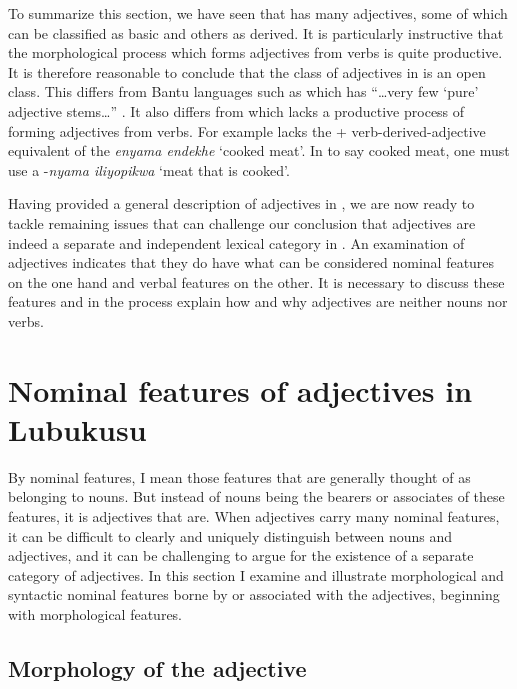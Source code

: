 \documentclass[output=paper,
modfonts
]{langscibook}
\begin{document}
To summarize this section, we have seen that  has many adjectives, some of which can be classified as basic and others as derived. It is particularly instructive that the morphological process which forms adjectives from verbs is quite productive. It is therefore reasonable to conclude that the class of adjectives in  is an open class. This differs from Bantu languages such as  which has “…very few ‘pure’ adjective stems…” \citep[24]{Mchombo2004}. It also differs from  which lacks a productive process of forming adjectives from verbs. For example  lacks the  + verb-derived-adjective equivalent of the  \textit{enyama endekhe} ‘cooked meat’. In  to say cooked meat, one must use a  -\textit{nyama iliyopikwa }‘meat that is cooked’.

Having provided a general description of adjectives in , we are now ready to tackle remaining issues that can challenge our conclusion that adjectives are indeed a separate and independent lexical category in . An examination of  adjectives indicates that they do have what can be considered nominal features on the one hand and verbal features on the other. It is necessary to discuss these features and in the process explain how and why adjectives are neither nouns nor verbs.

\section{Nominal features of adjectives in Lubukusu}\label{sec:wasike:3}

By nominal features, I mean those features that are generally thought of as belonging to nouns. But instead of nouns being the bearers or associates of these features, it is adjectives that are. When adjectives carry many nominal features, it can be difficult to clearly and uniquely distinguish between nouns and adjectives, and it can be challenging to argue for the existence of a separate category of adjectives. In this section I examine and illustrate morphological and syntactic nominal features borne by or associated with the  adjectives, beginning with morphological features.

\subsection{Morphology of the adjective}
\end{document}
